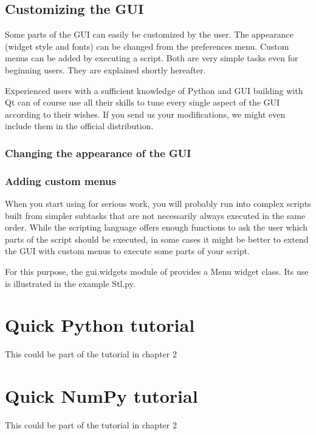 \subsection{Customizing the GUI}
\label{sec:customize-gui}

Some parts of the \pyformex GUI can easily be customized by the user. 
The appearance (widget style and fonts) can be changed from the preferences menu. Custom menus can be added by executing a script. Both are very simple tasks even for beginning users. They are explained shortly hereafter.

Experienced users with a sufficient knowledge of Python and GUI building with Qt can of course use all their skills to tune every single aspect of the \pyformex GUI according to their wishes. If you send us your modifications, we might even include them in the official distribution.


\subsubsection{Changing the appearance of the GUI}
\label{sec:chang-appe-gui}


\subsubsection{Adding custom menus}
\label{sec:adding-custom-menus}

When you start using \pyformex for serious work, you will probably run into complex scripts built from simpler subtasks that are not necessarily always executed in the same order. While the \pyformex scripting language offers enough functions to ask the user which parts of the script should be executed, in some cases it might be better to extend the \pyformex GUI with custom menus to execute some parts of your script.

For this purpose, the gui.widgets module of \pyformex provides a Menu widget class. Its use is illustrated in the example Stl.py.


\section{Quick {Python tutorial}}
\label{sec:python-tutorial}
This could be part of the tutorial in chapter 2

\section{Quick NumPy tutorial}
\label{sec:numpy-tutorial}
This could be part of the tutorial in chapter 2

